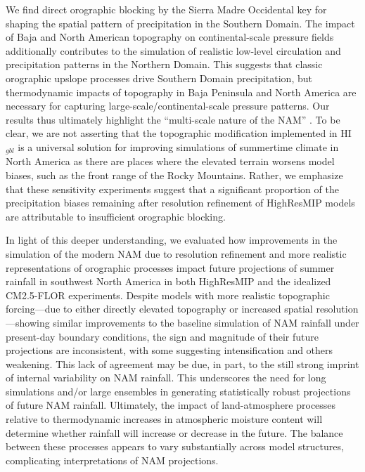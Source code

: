 \documentclass[draft]{agujournal2019}
\begin{document}
We find direct orographic blocking by the Sierra Madre Occidental key for shaping the spatial pattern of precipitation in the Southern Domain. The impact of Baja and North American topography on continental-scale pressure fields additionally contributes to the simulation of realistic low-level circulation and precipitation patterns in the Northern Domain. This suggests that classic orographic upslope processes drive Southern Domain precipitation, but thermodynamic impacts of topography in Baja Peninsula and North America are necessary for capturing large-scale/continental-scale pressure patterns. Our results thus ultimately highlight the ``multi-scale nature of the NAM'' \cite{ye23jc}. To be clear, we are not asserting that the topographic modification implemented in HI$_{gbl}$ is a universal solution for improving simulations of summertime climate in North America as there are places where the elevated terrain worsens model biases, such as the front range of the Rocky Mountains. Rather, we emphasize that these sensitivity experiments suggest that a significant proportion of the precipitation biases remaining after resolution refinement of HighResMIP models are attributable to insufficient orographic blocking. 

In light of this deeper understanding, we evaluated how improvements in the simulation of the modern NAM due to resolution refinement and more realistic representations of orographic processes impact future projections of summer rainfall in southwest North America in both HighResMIP and the idealized CM2.5-FLOR experiments. Despite models with more realistic topographic forcing---due to either directly elevated topography or increased spatial resolution---showing similar improvements to the baseline simulation of NAM rainfall under present-day boundary conditions, the sign and magnitude of their future projections are inconsistent, with some suggesting intensification and others weakening. This lack of agreement may be due, in part, to the still strong imprint of internal variability on NAM rainfall. This underscores the need for long simulations and/or large ensembles in generating statistically robust projections of future NAM rainfall. Ultimately, the impact of land-atmosphere processes relative to thermodynamic increases in atmospheric moisture content will determine whether rainfall will increase or decrease in the future. The balance between these processes appears to vary substantially across model structures, complicating interpretations of NAM projections.
\end{document}
